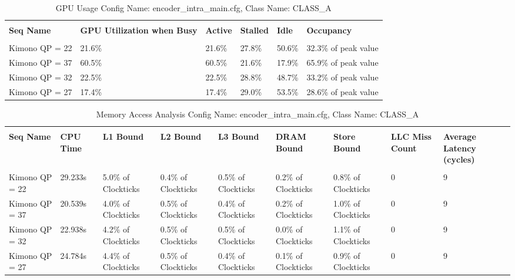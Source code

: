 \documentclass{article}%
\begin{document}
\newpage%
\begin{longtabu}{| X[l] | X[l] | X[l] | X[l] | X[l] | X[l] |}%
\caption{%
GPU Usage\newline%
 Config Name: encoder\_intra\_main.cfg,\newline%
 Class Name: CLASS\_A\newline%
%
}%
\hline%
&&&&&\\%
\textbf{Seq Name}&\textbf{GPU Utilization when Busy}&\textbf{Active}&\textbf{Stalled}&\textbf{Idle}&\textbf{Occupancy}\\%
&&&&&\\%
\hline%
\endhead%
Kimono\newline%
 QP = 22&21.6\%&21.6\%&27.8\%&50.6\%&32.3\% of peak value\\%
\hline%
Kimono\newline%
 QP = 37&60.5\%&60.5\%&21.6\%&17.9\%&65.9\% of peak value\\%
\hline%
Kimono\newline%
 QP = 32&22.5\%&22.5\%&28.8\%&48.7\%&33.2\% of peak value\\%
\hline%
Kimono\newline%
 QP = 27&17.4\%&17.4\%&29.0\%&53.5\%&28.6\% of peak value\\%
\hline%
\end{longtabu}%
\begin{longtabu}{| X[l] | X[l] | X[l] | X[l] | X[l] | X[l] | X[l] | X[l] | X[l] |}%
\caption{%
Memory Access Analysis\newline%
 Config Name: encoder\_intra\_main.cfg,\newline%
 Class Name: CLASS\_A\newline%
%
}%
\hline%
&&&&&&&&\\%
\textbf{Seq Name}&\textbf{CPU Time}&\textbf{L1 Bound}&\textbf{L2 Bound}&\textbf{L3 Bound}&\textbf{DRAM Bound}&\textbf{Store Bound}&\textbf{LLC Miss Count}&\textbf{Average Latency (cycles)}\\%
&&&&&&&&\\%
\hline%
\endhead%
Kimono\newline%
 QP = 22&29.233s&5.0\% of Clockticks&0.4\% of Clockticks&0.5\% of Clockticks&0.2\% of Clockticks&0.8\% of Clockticks&0&9\\%
\hline%
Kimono\newline%
 QP = 37&20.539s&4.0\% of Clockticks&0.5\% of Clockticks&0.4\% of Clockticks&0.2\% of Clockticks&1.0\% of Clockticks&0&9\\%
\hline%
Kimono\newline%
 QP = 32&22.938s&4.2\% of Clockticks&0.5\% of Clockticks&0.5\% of Clockticks&0.0\% of Clockticks&1.1\% of Clockticks&0&9\\%
\hline%
Kimono\newline%
 QP = 27&24.784s&4.4\% of Clockticks&0.5\% of Clockticks&0.4\% of Clockticks&0.1\% of Clockticks&0.9\% of Clockticks&0&9\\%
\hline%
\end{longtabu}%
\end{document}
